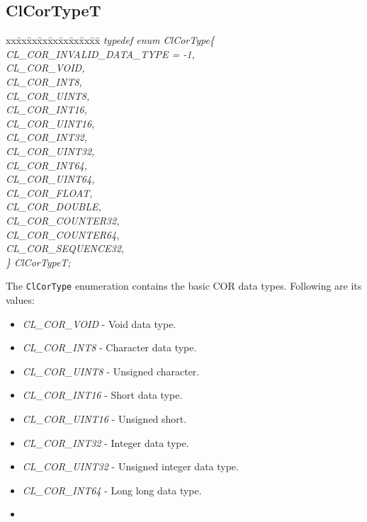 \begin{flushleft}
\subsection{ClCorTypeT}
\begin{tabbing}
xx\=xx\=xx\=xx\=xx\=xx\=xx\=xx\=xx\=\kill
\textit{typedef enum ClCorType\{}\\
\>\>\>\>\textit{CL\_COR\_INVALID\_DATA\_TYPE = -1,}\\
\>\>\>\>\textit{CL\_COR\_VOID,}\\
\>\>\>\>\textit{CL\_COR\_INT8,}\\
\>\>\>\>\textit{CL\_COR\_UINT8,}\\
\>\>\>\>\textit{CL\_COR\_INT16,}\\
\>\>\>\>\textit{CL\_COR\_UINT16,}\\
\>\>\>\>\textit{CL\_COR\_INT32,}\\
\>\>\>\>\textit{CL\_COR\_UINT32,}\\
\>\>\>\>\textit{CL\_COR\_INT64,}\\
\>\>\>\>\textit{CL\_COR\_UINT64,}\\
\>\>\>\>\textit{CL\_COR\_FLOAT,}\\
\>\>\>\>\textit{CL\_COR\_DOUBLE,}\\
\>\>\>\>\textit{CL\_COR\_COUNTER32,}\\
\>\>\>\>\textit{CL\_COR\_COUNTER64,}\\
\>\>\>\>\textit{CL\_COR\_SEQUENCE32,}\\
\textit{\} ClCorTypeT;}\end{tabbing}
The {\tt{ClCorType}} enumeration contains the basic COR data types. Following are its values:
\begin{itemize}
\item
\textit{CL\_\-COR\_\-VOID} - Void data type.
\item
\textit{ CL\_\-COR\_\-INT8} - Character data type.
\item
\textit{  CL\_\-COR\_\-UINT8} - Unsigned character.
\item
\textit{ CL\_\-COR\_\-INT16} - Short data type.
\item
\textit{  CL\_\-COR\_\-UINT16} - Unsigned short.
\item
\textit{  CL\_\-COR\_\-INT32} - Integer data type.
\item
\textit{  CL\_\-COR\_\-UINT32} - Unsigned integer data type.
\item
\textit{  CL\_\-COR\_\-INT64} - Long long data type.
\item

\end{itemize}
\end{flushleft}
